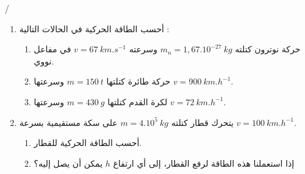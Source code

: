 \documentclass[12pt,a4paper]{article}
\begin{document}
  
					\begin{exercice}{}/
	\begin{enumerate}
	\item 
أحسب الطاقة الحركیة في الحالات التالیة :
	\begin{enumerate}
	\item حركة نوترون كتلته
	$m_n = 1,67.10^{-27}\ kg$
	وسرعته
	$v = 67\ km.s^{-1}$
	في مفاعل نووي.
	\item حركة طائرة كتلتھا
	$m = 150\ t$
	وسرعتھا
$v = 900\ km.h^{-1}$.
\item لكرة القدم كتلتها 
$m = 430\ g$
وسرعتها 
$v=72\ km.h^{-1}$.
\end{enumerate}
\item يتحرك قطار كتلته 
$m=4.10^{5}\ kg$
على سكة مستقيمية بسرعة 
$v = 100\ km.h^{-1}$.
\begin{enumerate}
\item أحسب الطاقة الحركية للقطار.
\item إذا استعملنا هذه الطاقة لرفع القطار، إلى أي ارتفاع 
$h$
يمكن أن يصل إليه؟
\end{enumerate}
\end{enumerate}
	\end{exercice}%
\end{document}
